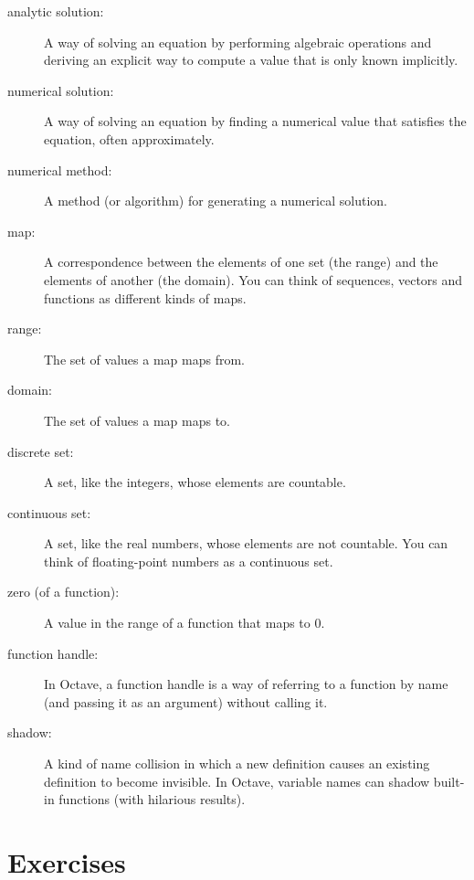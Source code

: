 \begin{description}

\item[analytic solution:] A way of solving an equation by performing
algebraic operations and deriving an explicit way to
compute a value that is only known implicitly.

\item[numerical solution:] A way of solving an equation by finding
a numerical value that satisfies the equation, often approximately.

\item[numerical method:] A method (or algorithm) for generating
a numerical solution.

\item[map:] A correspondence between the elements of one set (the
range) and the elements of another (the domain). You can think of
sequences, vectors and functions as different kinds of maps.

\item[range:] The set of values a map maps from.

\item[domain:] The set of values a map maps to.

\item[discrete set:] A set, like the integers, whose elements are
countable.

\item[continuous set:] A set, like the real numbers, whose elements
are not countable. You can think of floating-point numbers as a
continuous set.

\item[zero (of a function):] A value in the range of a function that
maps to 0.

\item[function handle:] In Octave, a function handle is a way of
referring to a function by name (and passing it as an argument)
without calling it.

\item[shadow:] A kind of name collision in which a new definition
causes an existing definition to become invisible. In Octave,
variable names can shadow built-in functions (with hilarious results). 

\end{description}

\section{Exercises}

